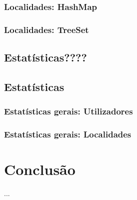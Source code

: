 \documentclass[a5paper,twocolumn, 11pt]{article}
\begin{document}
\subsubsection{Localidades: HashMap}
\subsubsection{Localidades: TreeSet}
\clearpage
\subsection{Estatísticas????}
\clearpage
\subsection{Estatísticas}
\subsubsection{Estatísticas gerais: Utilizadores}
\subsubsection{Estatísticas gerais: Localidades}



\clearpage
\section{Conclusão}
...
\clearpage
\end{document}
